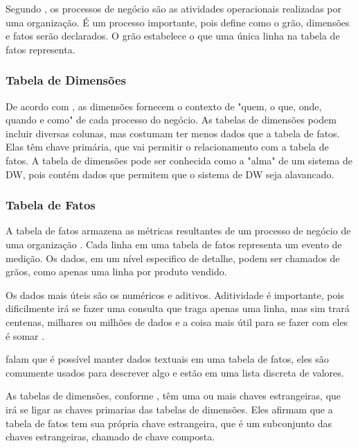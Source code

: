 Segundo , os processos de negócio são as atividades operacionais realizadas por uma organização. É um processo importante, pois define como o grão, dimensões e fatos serão declarados. O grão estabelece o que uma única linha na tabela de fatos representa.

\subsubsection{Tabela de Dimensões}
De acordo com , as dimensões fornecem o contexto de "quem, o que, onde, quando e como" de cada processo do negócio. As tabelas de dimensões podem incluir diversas colunas, mas costumam ter menos dados que a tabela de fatos. Elas têm chave primária, que vai permitir o relacionamento com a tabela de fatos.
A tabela de dimensões pode ser conhecida como a "alma" de um sistema de DW, pois contém dados que permitem que o sistema de DW seja alavancado.

\subsubsection{Tabela de Fatos}
A tabela de fatos armazena as métricas resultantes de um processo de negócio de uma organização \citep{kimball2013}. Cada linha em uma tabela de fatos representa um evento de medição. Os dados, em um nível especifico de detalhe, podem ser chamados de grãos, como apenas uma linha por produto vendido.

Os dados mais úteis são os numéricos e aditivos. Aditividade é importante, pois dificilmente irá se fazer uma consulta que traga apenas uma linha, mas sim trará centenas, milhares ou milhões de dados e a coisa mais útil para se fazer com eles é somar \citep{kimball2013}.

 falam que é possível manter dados textuais em uma tabela de fatos, eles são comumente usados para descrever algo e estão em uma lista discreta de valores. 

As tabelas de dimensões, conforme , têm uma ou mais chaves estrangeiras, que irá se ligar as chaves primarias das tabelas de dimensões. Eles afirmam que a tabela de fatos tem sua própria chave estrangeira, que é um subconjunto das chaves estrangeiras, chamado de chave composta. 

